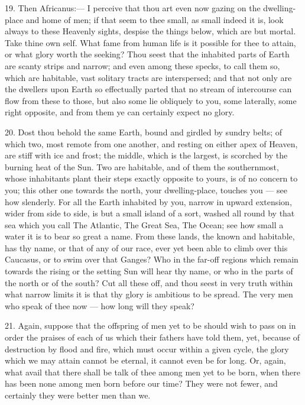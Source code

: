 \documentclass[a4paper, 11pt, oneside, polutonikogreek, english]{article}
\begin{document}
19. Then Africanus:--- I perceive that thou art even now gazing on the dwelling-place and home of men; if that seem to thee small, as small indeed it is, look always to these Heavenly sights, despise the things below, which are but mortal. Take thine own self. What fame from human life is it possible for thee to attain, or what glory worth the seeking? Thou seest that the inhabited parts of Earth are scanty strips and narrow; and even among these specks, to call them so, which are habitable, vast solitary tracts are interspersed; and that not only are the dwellers upon Earth so effectually parted that no stream of intercourse can flow from these to those, but also some lie obliquely to you, some laterally, some right opposite, and from them ye can certainly expect no glory.

20. Dost thou behold the same Earth, bound and girdled by sundry belts; of which two, most remote from one another, and resting on either apex of Heaven, are stiff with ice and frost; the middle, which is the largest, is scorched by the burning heat of the Sun. Two are habitable, and of them the southernmost, whose inhabitants plant their steps exactly opposite to yours, is of no concern to you; this other one towards the north, your dwelling-place, touches you --- see how slenderly. For all the Earth inhabited by you, narrow in upward extension, wider from side to side, is but a small island of a sort, washed all round by that sea which you call The Atlantic, The Great Sea, The Ocean; see how small a water it is to bear so great a name. From these lands, the known and habitable, has thy name, or that of any of our race, ever yet been able to climb over this Caucasus, or to swim over that Ganges? Who in the far-off regions which remain towards the rising or the setting Sun will hear thy name, or who in the parts of the north or of the south? Cut all these off, and thou seest in very truth within what narrow limits it is that thy glory is ambitious to be spread. The very men who speak of thee now --- how long will they speak?

21. Again, suppose that the offspring of men yet to be should wish to pass on in order the praises of each of us which their fathers have told them, yet, because of destruction by flood and fire, which must occur within a given cycle, the glory which we may attain cannot be eternal, it cannot even be for long. Or, again, what avail that there shall be talk of thee among men yet to be born, when there has been none among men born before our time? They were not fewer, and certainly they were better men than we.
\end{document}
